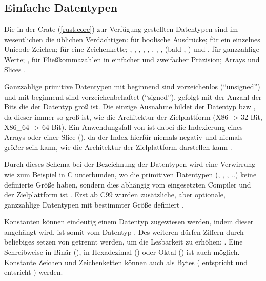 \subsection{Einfache Datentypen}

Die in der  Crate (\autoref{rust:core}) zur Verfügung gestellten Datentypen sind im wesentlichen die üblichen  Verdächtigen:  für boolische Ausdrücke;  für ein einzelnes Unicode Zeichen;  für eine Zeichenkette; , , , , , , , , (bald ,  \cite{rust:github:128bit_integer:rfc}) und ,   für ganzzahlige Werte; ,  für Fließkommazahlen in einfacher und zweifacher Präzision; Arrays und Slices \cite{rust:book:primitives}.

Ganzzahlige primitive Datentypen mit  beginnend sind vorzeichenlos (\enquote{unsigned}) und mit  beginnend sind vorzeichenbehaftet (\enquote{signed}), gefolgt mit der Anzahl der Bits  die der Datentyp groß ist.
 Die einzige Ausnahme bildet der Datentyp  bzw , da dieser immer so groß ist, wie die Architektur der Zielplattform (X86 -> 32 Bit, X86\_64 -> 64 Bit).
Ein Anwendungsfall von  ist dabei die Indexierung eines Arrays oder einer Slice (), da der Index hierfür niemals negativ und niemals größer sein kann, wie die Architektur der Zielplattform darstellen kann .

Durch dieses Schema bei der Bezeichnung der Datentypen wird eine Verwirrung wie zum Beispiel in C unterbunden, wo die primitiven Datentypen (, , , ..) keine definierte Größe haben, sondern dies abhängig vom eingesetzten Compiler und der Zielplattform ist \cite[187]{deitel2013c}. Erst ab C99 wurden zusätzliche, aber optionale, ganzzahlige Datentypen mit bestimmter Größe definiert \cite[141]{goll2014c}.

Konstanten können eindeutig einem Datentyp zugewiesen werden, indem dieser angehängt wird.
 ist somit vom Datentyp .
Des weiteren dürfen Ziffern durch beliebiges setzen von \rustcinline{_} getrennt werden, um die Lesbarkeit zu erhöhen: .
Eine Schreibweise in Binär (), in Hexadezimal () oder Oktal () ist auch möglich. 
Konstante Zeichen und Zeichenketten können auch als Bytes ( entspricht  und  entsricht \rustcinline{&[u8]})  werden.

